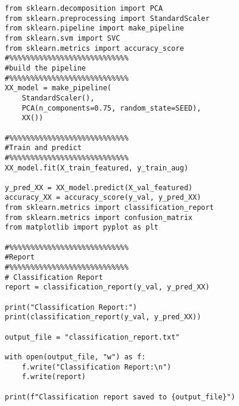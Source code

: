 \documentclass[a4paper,11pt]{article}
\begin{document}
\begin{verbatim}
from sklearn.decomposition import PCA
from sklearn.preprocessing import StandardScaler
from sklearn.pipeline import make_pipeline
from sklearn.svm import SVC
from sklearn.metrics import accuracy_score
#%%%%%%%%%%%%%%%%%%%%%%%%%%%%
#build the pipeline
#%%%%%%%%%%%%%%%%%%%%%%%%%%%%
XX_model = make_pipeline(
    StandardScaler(), 
    PCA(n_components=0.75, random_state=SEED), 
    XX())

#%%%%%%%%%%%%%%%%%%%%%%%%%%%%
#Train and predict
#%%%%%%%%%%%%%%%%%%%%%%%%%%%%
XX_model.fit(X_train_featured, y_train_aug)

y_pred_XX = XX_model.predict(X_val_featured)
accuracy_XX = accuracy_score(y_val, y_pred_XX)
from sklearn.metrics import classification_report
from sklearn.metrics import confusion_matrix
from matplotlib import pyplot as plt

#%%%%%%%%%%%%%%%%%%%%%%%%%%%%
#Report
#%%%%%%%%%%%%%%%%%%%%%%%%%%%%
# Classification Report
report = classification_report(y_val, y_pred_XX)

print("Classification Report:")
print(classification_report(y_val, y_pred_XX))

output_file = "classification_report.txt"

with open(output_file, "w") as f:
    f.write("Classification Report:\n")
    f.write(report)

print(f"Classification report saved to {output_file}")
\end{verbatim}
\end{document}
